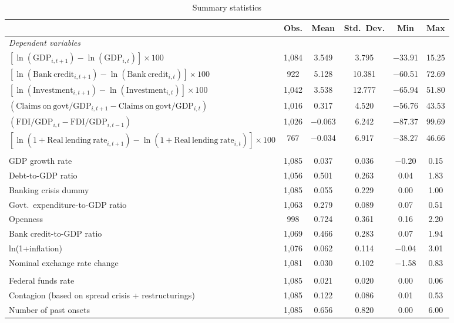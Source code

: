 \documentclass[12pt]{article}
\renewcommand{\arraystretch}{1.25}
\begin{document}
\begin{table}[th]
\centering
\caption{Summary statistics}
\label{tab:A4}
\begingroup
\small
\renewcommand{\arraystretch}{1.3}
\begin{tabularx}{\textwidth}{X ccccc}
\toprule
 & Obs. & Mean & Std.\ Dev. & Min & Max \\
\midrule
\multicolumn{6}{l}{\textit{Dependent variables}} \\
\mbox{$[\ln(\mathrm{GDP}_{i,t+1})-\ln(\mathrm{GDP}_{i,t})]\times 100$} & 1{,}084 & 3.549 & 3.795 & $-$33.91 & 15.25 \\
\mbox{$[\ln(\mathrm{Bank\ credit}_{i,t+1})-\ln(\mathrm{Bank\ credit}_{i,t})]\times 100$} & 922 & 5.128 & 10.381 & $-$60.51 & 72.69 \\
\mbox{$[\ln(\mathrm{Investment}_{i,t+1})-\ln(\mathrm{Investment}_{i,t})]\times 100$} & 1{,}042 & 3.538 & 12.777 & $-$65.94 & 51.80 \\
\mbox{$(\mathrm{Claims\ on\ govt}/\mathrm{GDP}_{i,t+1}-\mathrm{Claims\ on\ govt}/\mathrm{GDP}_{i,t})$} & 1{,}016 & 0.317 & 4.520 & $-$56.76 & 43.53 \\
\mbox{$(\mathrm{FDI}/\mathrm{GDP}_{i,t}-\mathrm{FDI}/\mathrm{GDP}_{i,t-1})$} & 1{,}026 & $-$0.063 & 6.242 & $-$87.37 & 99.69 \\
\mbox{$[\ln(1+\mathrm{Real\ lending\ rate}_{i,t+1})-\ln(1+\mathrm{Real\ lending\ rate}_{i,t})]\times 100$} & 767 & $-$0.034 & 6.917 & $-$38.27 & 46.66 \\
\addlinespace[8pt]
\multicolumn{6}{l}{\textit{Baseline control variables}} \\
GDP growth rate & 1{,}085 & 0.037 & 0.036 & $-$0.20 & 0.15 \\
Debt-to-GDP ratio & 1{,}056 & 0.501 & 0.263 & 0.04 & 1.83 \\
Banking crisis dummy & 1{,}085 & 0.055 & 0.229 & 0.00 & 1.00 \\
Govt.\ expenditure-to-GDP ratio & 1{,}063 & 0.279 & 0.089 & 0.07 & 0.51 \\
Openness & 998 & 0.724 & 0.361 & 0.16 & 2.20 \\
Bank credit-to-GDP ratio & 1{,}069 & 0.466 & 0.283 & 0.07 & 1.94 \\
ln(1+inflation) & 1{,}076 & 0.062 & 0.114 & $-$0.04 & 3.01 \\
Nominal exchange rate change & 1{,}081 & 0.030 & 0.102 & $-$1.58 & 0.83 \\
\addlinespace[8pt]
\multicolumn{6}{l}{\textit{Predictors}} \\
Federal funds rate & 1{,}085 & 0.021 & 0.020 & 0.00 & 0.06 \\
Contagion (based on spread crisis + restructurings) & 1{,}085 & 0.122 & 0.086 & 0.01 & 0.53 \\
Number of past onsets & 1{,}085 & 0.656 & 0.820 & 0.00 & 6.00 \\
\bottomrule
\end{tabularx}
\endgroup
\end{table}
\end{document}

